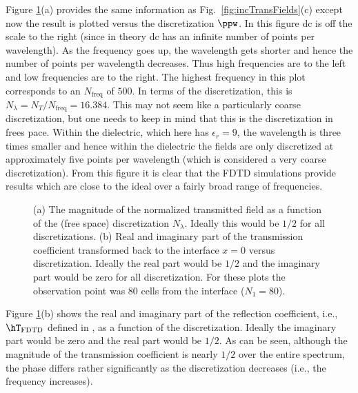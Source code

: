 Figure \ref{fig:transCoefVsFreq}(a) provides the same information as
Fig.\ \ref{fig:incTransFields}(c) except now the result is plotted
versus the discretization $\ppw$.  In this figure dc is off the scale
to the right (since in theory dc has an infinite number of points per
wavelength).  As the frequency goes up, the wavelength gets shorter
and hence the number of points per wavelength decreases.  Thus high
frequencies are to the left and low frequencies are to the right.  The
highest frequency in this plot corresponds to an $N_{\mathrm{freq}}$
of $500$.  In terms of the discretization, this is
$N_\lambda=N_T/N_{\mathrm{freq}}=16.384$.  This may not seem like a
particularly coarse discretization, but one needs to keep in mind that
this is the discretization in frees pace.  Within the dielectric, which
here has $\epsilon_r=9$, the wavelength is three times smaller and
hence within the dielectric the fields are only discretized at
approximately five points per wavelength (which is considered a very
coarse discretization).  From this figure it is clear that the FDTD
simulations provide results which are close to the ideal over a fairly
broad range of frequencies.

\begin{figure}
  \begin{center}
  \end{center}
  \caption{(a) The magnitude of the normalized transmitted field as a
    function of the (free space) discretization $N_\lambda$.  Ideally
    this would be $1/2$ for all discretizations. (b) Real and
    imaginary part of the transmission coefficient transformed back to
    the interface $x=0$ versus discretization.  Ideally the real part
    would be $1/2$ and the imaginary part would be zero for all
    discretization.  For these plots the observation point was $80$
    cells from the interface ($N_1 = 80$).
   \label{fig:transCoefVsFreq}}
\end{figure}

Figure \ref{fig:transCoefVsFreq}(b) shows the real and imaginary part of
the reflection coefficient, i.e., $\hT_{\mbox{\scriptsize FDTD}}$
defined in , as a function of the discretization.
Ideally the imaginary part would be zero and the real part would be
$1/2$.  As can be seen, although the magnitude of the transmission
coefficient is nearly $1/2$ over the entire spectrum, the phase differs
rather significantly as the discretization decreases (i.e., the
frequency increases).  

